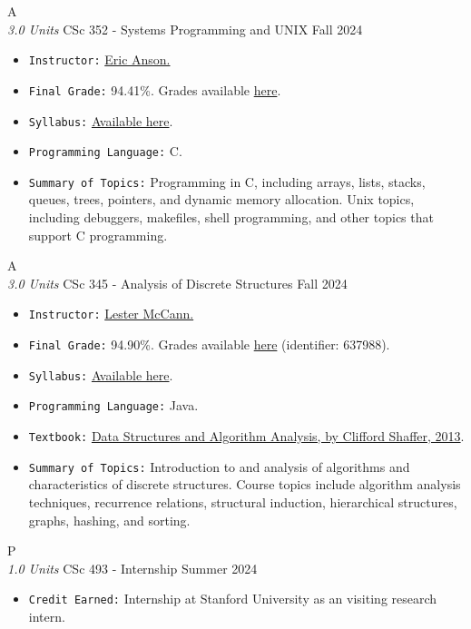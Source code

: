 \cventry
{A \\ \small{\textit{3.0 Units}}}
{CSc 352 - Systems Programming and UNIX}
{Fall 2024}
{}
{}
{
  \begin{itemize}
    \item \texttt{Instructor:} \href{https://www.cs.arizona.edu/person/eric-anson}{Eric Anson.}
    \item \texttt{Final Grade:} 94.41\%. Grades available \href{https://mhrezaei.com/assets/cv/courses/Fall2024/CSC352/Grades.pdf}{here}.
    \item \texttt{Syllabus:} \href{https://mhrezaei.com/assets/cv/courses/Fall2024/CSC352/Syllabus.pdf}{Available here}.
    \item \texttt{Programming Language:} C.
    \item \texttt{Summary of Topics:} Programming in C, including arrays, lists, stacks, queues, trees, pointers, and dynamic
    memory allocation. Unix topics, including debuggers, makefiles, shell programming, and other topics that support
    C programming.
  \end{itemize}
}

\cventry
{A \\ \small{\textit{3.0 Units}}}
{CSc 345 - Analysis of Discrete Structures}
{Fall 2024}
{}
{}
{
  \begin{itemize}
    \item \texttt{Instructor:} \href{http://mccann.cs.arizona.edu}{Lester McCann.}
    \item \texttt{Final Grade:} 94.90\%. Grades available \href{https://mhrezaei.com/assets/cv/courses/Fall2024/CSC345/Grades.pdf}{here} (identifier: 637988).
    \item \texttt{Syllabus:} \href{https://mhrezaei.com/assets/cv/courses/Fall2024/CSC345/Syllabus.pdf}{Available here}.
    \item \texttt{Programming Language:} Java.
    \item \texttt{Textbook:} \href{https://people.cs.vt.edu/shaffer/Book/JAVA3elatest.pdf}{Data Structures and Algorithm Analysis, by Clifford Shaffer, 2013}.
    \item \texttt{Summary of Topics:} Introduction to and analysis of algorithms and characteristics of discrete structures. Course
    topics include algorithm analysis techniques, recurrence relations, structural induction,
    hierarchical structures, graphs, hashing, and sorting.
  \end{itemize}
}

\cventry
{P \\ \small{\textit{1.0 Units}}}
{CSc 493 - Internship}
{Summer 2024}
{}
{}
{
  \begin{itemize}
    \item \texttt{Credit Earned:} Internship at Stanford University as an visiting research intern.
  \end{itemize}
}

